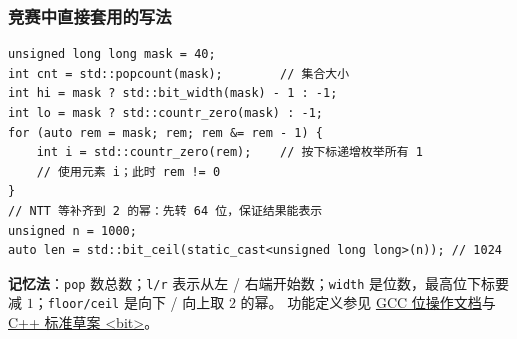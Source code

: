 \subsubsection{竞赛中直接套用的写法}
\begin{verbatim}
unsigned long long mask = 40;
int cnt = std::popcount(mask);        // 集合大小
int hi = mask ? std::bit_width(mask) - 1 : -1;
int lo = mask ? std::countr_zero(mask) : -1;
for (auto rem = mask; rem; rem &= rem - 1) {
    int i = std::countr_zero(rem);    // 按下标递增枚举所有 1
    // 使用元素 i；此时 rem != 0
}
// NTT 等补齐到 2 的幂：先转 64 位，保证结果能表示
unsigned n = 1000;
auto len = std::bit_ceil(static_cast<unsigned long long>(n)); // 1024
\end{verbatim}

\textbf{记忆法}：\texttt{pop} 数总数；\texttt{l/r} 表示从左 / 右端开始数；\texttt{width} 是位数，最高位下标要减 $1$；\texttt{floor/ceil} 是向下 / 向上取 $2$ 的幂。
功能定义参见 \href{https://gcc.gnu.org/onlinedocs/gcc/Bit-Operation-Builtins.html}{GCC 位操作文档}与 \href{https://eel.is/c++draft/bit}{C++ 标准草案 <bit>}。
